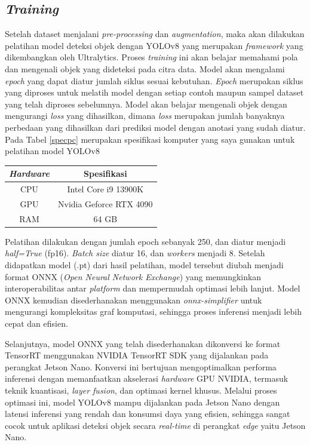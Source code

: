 \subsection{\emph{Training}}
Setelah dataset menjalani \emph{pre-processing} dan \emph{augmentation}, maka akan dilakukan pelatihan model deteksi objek dengan YOLOv8 yang merupakan \emph{framework} yang dikembangkan oleh Ultralytics. Proses \emph{training} ini akan belajar memahami pola dan mengenali objek yang dideteksi pada citra data. Model akan mengalami \emph{epoch} yang dapat diatur jumlah siklus sesuai kebutuhan. \emph{Epoch} merupakan siklus yang diproses untuk melatih model dengan setiap contoh maupun sampel dataset yang telah diproses sebelumnya. Model akan belajar mengenali objek dengan mengurangi \emph{loss} yang dihasilkan, dimana \emph{loss} merupakan jumlah banyaknya perbedaan yang dihasilkan dari prediksi model dengan anotasi yang sudah diatur. Pada Tabel \ref{specpc} merupakan spesifikasi komputer yang saya gunakan untuk pelatihan model YOLOv8

\begin{table}[h!]
  \centering
  \label{tbl:specpc}
  \begin{tabular}{|c|c|}
    \hline
    \rowcolor[gray]{0.9}
    \textbf{\emph{Hardware}} & \textbf{Spesifikasi} \\ \hline
    CPU               & Intel Core i9 13900K \\ \hline
    GPU               & Nvidia Geforce RTX 4090 \\ \hline
    RAM               & 64 GB \\ \hline
  \end{tabular}
\end{table}

Pelatihan dilakukan dengan jumlah epoch sebanyak 250, dan diatur menjadi \emph{half=True} (fp16). \emph{Batch size} diatur 16, dan \emph{workers} menjadi 8. Setelah didapatkan model (.pt) dari hasil pelatihan, model tersebut diubah menjadi format ONNX (\emph{Open Neural Network Exchange}) yang memungkinkan interoperabilitas antar \emph{platform} dan mempermudah optimasi lebih lanjut. Model ONNX kemudian disederhanakan menggunakan \emph{onnx-simplifier} untuk mengurangi kompleksitas graf komputasi, sehingga proses inferensi menjadi lebih cepat dan efisien.

Selanjutnya, model ONNX yang telah disederhanakan dikonversi ke format TensorRT menggunakan NVIDIA TensorRT SDK yang dijalankan pada perangkat Jetson Nano. Konversi ini bertujuan mengoptimalkan performa inferensi dengan memanfaatkan akselerasi \emph{hardware} GPU NVIDIA, termasuk teknik kuantisasi, \emph{layer fusion}, dan optimasi kernel khusus. Melalui proses optimasi ini, model YOLOv8 mampu dijalankan pada Jetson Nano dengan latensi inferensi yang rendah dan konsumsi daya yang efisien, sehingga sangat cocok untuk aplikasi deteksi objek secara \emph{real-time} di perangkat \emph{edge} yaitu Jetson Nano.

